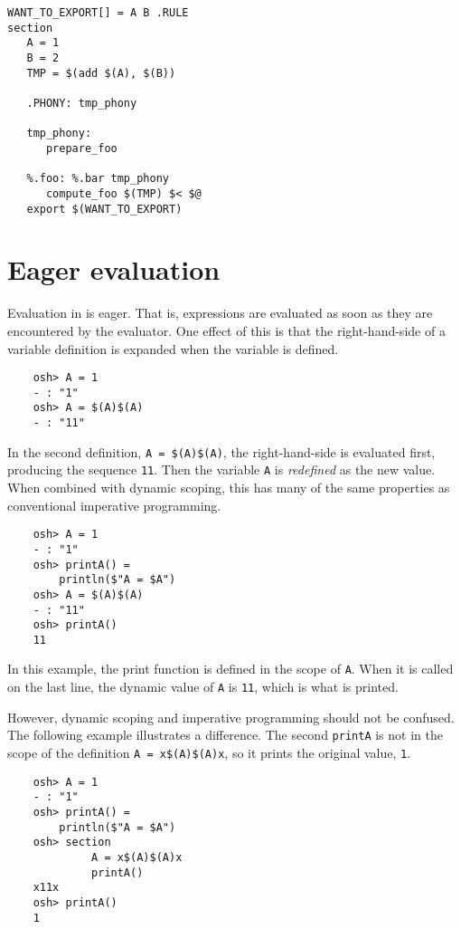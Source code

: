\begin{verbatim}
WANT_TO_EXPORT[] = A B .RULE
section
   A = 1
   B = 2
   TMP = $(add $(A), $(B))

   .PHONY: tmp_phony

   tmp_phony:
      prepare_foo

   %.foo: %.bar tmp_phony
      compute_foo $(TMP) $< $@
   export $(WANT_TO_EXPORT)
\end{verbatim}

\section{Eager evaluation}
\label{section:eager}

Evaluation in  is eager.  That is, expressions are evaluated as soon as they are
encountered by the evaluator.  One effect of this is that the right-hand-side of a variable
definition is expanded when the variable is defined.

\begin{verbatim}
    osh> A = 1
    - : "1"
    osh> A = $(A)$(A)
    - : "11"
\end{verbatim}

In the second definition, \verb+A = $(A)$(A)+, the right-hand-side is evaluated first, producing the
sequence \verb+11+.  Then the variable \verb+A+ is \emph{redefined} as the new value.  When combined
with dynamic scoping, this has many of the same properties as conventional imperative programming.

\begin{verbatim}
    osh> A = 1
    - : "1"
    osh> printA() =
        println($"A = $A")
    osh> A = $(A)$(A)
    - : "11"
    osh> printA()
    11
\end{verbatim}

In this example, the print function is defined in the scope of \verb+A+.  When it is called on
the last line, the dynamic value of \verb+A+ is \verb+11+, which is what is printed.

However, dynamic scoping and imperative programming should not be confused.  The following example
illustrates a difference.  The second \verb+printA+ is not in the scope of the definition
\verb+A = x$(A)$(A)x+, so it prints the original value, \verb+1+.

\begin{verbatim}
    osh> A = 1
    - : "1"
    osh> printA() =
        println($"A = $A")
    osh> section
             A = x$(A)$(A)x
             printA()
    x11x
    osh> printA()
    1
\end{verbatim}


